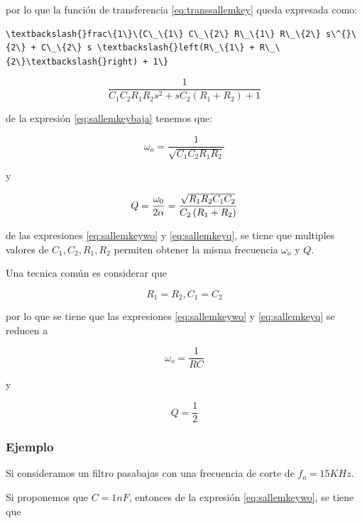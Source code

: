 \documentclass{article}
\begin{document}
por lo que la función de transferencia \eqref{eq:transsallemkey} queda
expresada como:


    \begin{Verbatim}[commandchars=\\\{\}]
\textbackslash{}frac\{1\}\{C\_\{1\} C\_\{2\} R\_\{1\} R\_\{2\} s\^{}\{2\} + C\_\{2\} s \textbackslash{}left(R\_\{1\} + R\_\{2\}\textbackslash{}right) + 1\}
    \end{Verbatim}

    \begin{equation}\label{eq:sallemkeybaja}
\frac{1}{C_{1} C_{2} R_{1} R_{2} s^{2} +  s C_{2} \left(R_{1} + R_{2}\right) + 1}
\end{equation}

    de la expresión \eqref{eq:sallemkeybaja} tenemos que:

\begin{equation}\label{eq:sallemkeywo}
\omega_{o}=\frac{1}{\sqrt{C_{1} C_{2} R_{1} R_{2}}}
\end{equation}

y

\begin{equation}\label{eq:sallemkeyq}
Q = { \omega_0 \over 2 \alpha } = \frac{ \sqrt{ R_1 R_2 C_1 C_2 } }{ C_2 \left( R_1 + R_2 \right) } 
\end{equation}

    de las expresiones \eqref{eq:sallemkeywo} y \eqref{eq:sallemkeyq}, se
tiene que multiples valores de $C_{1},C_{2},R_{1},R_{2}$ permiten
obtener la misma frecuencia $\omega_{o}$ y $Q$.

Una tecnica común es considerar que

\[
R_{1}=R_{2},C_{1}=C_{2}
\]

por lo que se tiene que las expresiones \eqref{eq:sallemkeywo} y
\eqref{eq:sallemkeyq} se reducen a

\[
\omega_{o}=\frac{1}{RC}
\]

y

\[
Q=\frac{1}{2}
\]

    \subsubsection{Ejemplo}\label{ejemplo}

Si consideramos un filtro pasabajas con una frecuencia de corte de
$f_{o}=15KHz$.

Si proponemos que $C=1nF$, entonces de la expresión
\eqref{eq:sallemkeywo}, se tiene que
\end{document}
